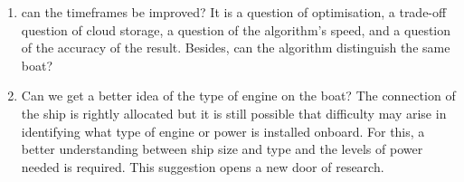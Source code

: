 \begin{enumerate}
    \item can the timeframes be improved? It is a question of optimisation, a trade-off question of cloud storage, a question of the algorithm's speed, and a question of the accuracy of the result. Besides, can the algorithm distinguish the same boat?
    
    \item Can we get a better idea of the type of engine on the boat? The connection of the ship is rightly allocated but it is still possible that difficulty may arise in identifying what type of engine or power is installed onboard. For this, a better understanding between ship size and type and the levels of power needed is required. This suggestion opens a new door of research.
\end{enumerate}
 
